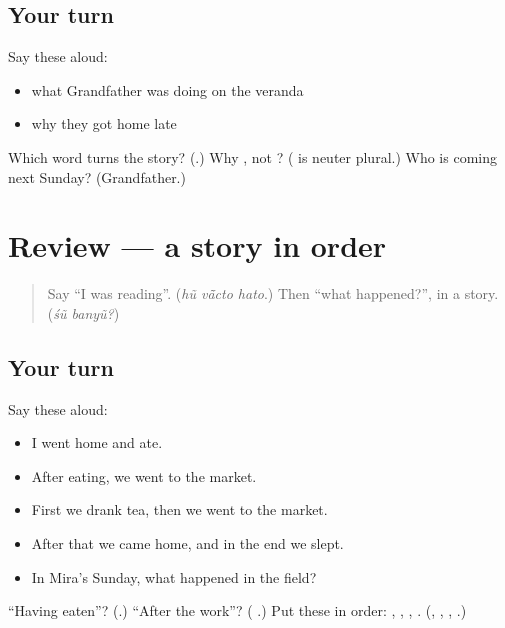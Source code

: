 \subsection*{Your turn}
Say these aloud:

\begin{itemize}
\raggedright
  \item what Grandfather was doing on the veranda
  \item why they got home late
\end{itemize}

\begin{tcolorbox}[breakable,colback=teal!4,colframe=teal!35!black,title={Before you move on}]
Which word turns the story? (\textbf{}.) Why \textbf{   }, not \textbf{  }? (\textbf{} is neuter plural.) Who is coming next Sunday? (Grandfather.)
\end{tcolorbox}
\section[(review)]{Review — a story in order}

\label{lesson:GU-R276-a-story-in-order}



\begin{quote}
Say \textquotedblleft{}I was reading\textquotedblright{}. (\emph{hũ vā̃cto hato}.) Then \textquotedblleft{}what happened?\textquotedblright{}, in a story. (\emph{śũ banyũ?})
\end{quote}

\subsection*{Your turn}
Say these aloud:

\begin{itemize}
\raggedright
  \item I went home and ate.
  \item After eating, we went to the market.
  \item First we drank tea, then we went to the market.
  \item After that we came home, and in the end we slept.
  \item In Mira's Sunday, what happened in the field?
\end{itemize}

\begin{tcolorbox}[breakable,colback=teal!4,colframe=teal!35!black,title={Before you move on}]
\textquotedblleft{}Having eaten\textquotedblright{}? (\textbf{}.) \textquotedblleft{}After the work\textquotedblright{}? (\textbf{  }.) Put these in order: \textbf{}, \textbf{}, \textbf{ }, \textbf{}. (\textbf{}, \textbf{}, \textbf{ }, \textbf{}.)
\end{tcolorbox}
